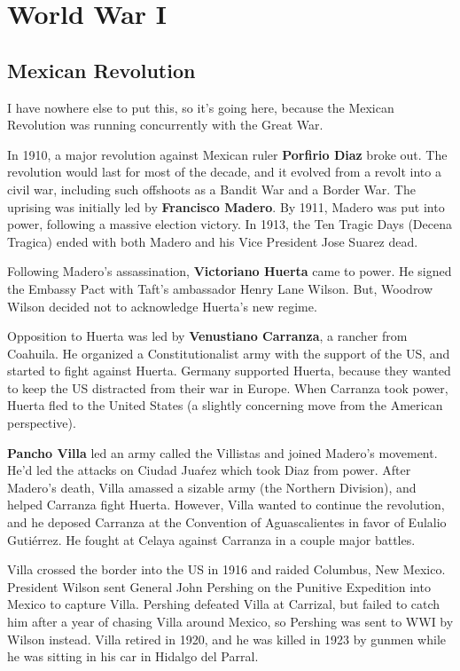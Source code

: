 \chapter{World War I}

\section{Mexican Revolution}

I have nowhere else to put this, so it's going here,
because the Mexican Revolution was running concurrently with the Great War.

In 1910, a major revolution against Mexican ruler \textbf{Porfirio Diaz} broke out.
The revolution would last for most of the decade, and it evolved from a revolt into a civil war,
including such offshoots as a Bandit War and a Border War.
The uprising was initially led by \textbf{Francisco Madero}.
By 1911, Madero was put into power, following a massive election victory.
In 1913, the Ten Tragic Days (Decena Tragica) ended with both Madero and his Vice President Jose Suarez dead.

Following Madero's assassination, \textbf{Victoriano Huerta} came to power.
He signed the Embassy Pact with Taft's ambassador Henry Lane Wilson.
But, Woodrow Wilson decided not to acknowledge Huerta's new regime.

Opposition to Huerta was led by \textbf{Venustiano Carranza}, a rancher from Coahuila.
He organized a Constitutionalist army with the support of the US,
and started to fight against Huerta.
Germany supported Huerta,
because they wanted to keep the US distracted from their war in Europe.
When Carranza took power, Huerta fled to the United States
(a slightly concerning move from the American perspective).

\textbf{Pancho Villa} led an army called the Villistas and joined Madero's movement.
He'd led the attacks on Ciudad Jua\'rez which took Diaz from power.
After Madero's death, Villa amassed a sizable army (the Northern Division),
and helped Carranza fight Huerta.
However, Villa wanted to continue the revolution,
and he deposed Carranza at the Convention of Aguascalientes in favor of Eulalio Guti\'errez.
He fought at Celaya against Carranza in a couple major battles.

Villa crossed the border into the US in 1916 and raided Columbus, New Mexico.
President Wilson sent General John Pershing on the Punitive Expedition into Mexico to capture Villa.
Pershing defeated Villa at Carrizal,
but failed to catch him after a year of chasing Villa around Mexico,
so Pershing was sent to WWI by Wilson instead.
Villa retired in 1920,
and he was killed in 1923 by gunmen while he was sitting in his car in Hidalgo del Parral.

